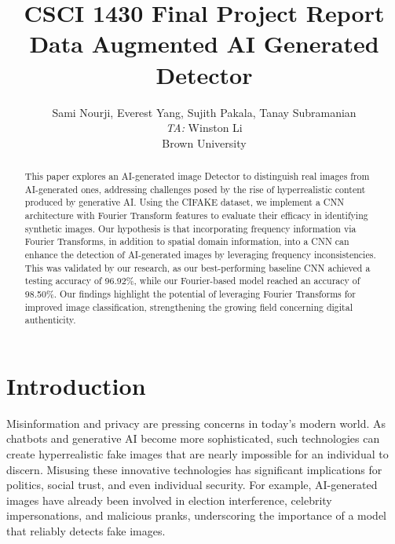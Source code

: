 \title{CSCI 1430 Final Project Report\\Data Augmented AI Generated Detector}

\author{Sami Nourji, Everest Yang, Sujith Pakala, Tanay Subramanian\\
    \emph{TA:} Winston Li \\
    Brown University\\
}

\maketitle

\begin{abstract}
    This paper explores an AI-generated image Detector to distinguish real images from AI-generated ones, addressing challenges posed by the rise of hyperrealistic content produced by generative AI. Using the CIFAKE dataset, we implement a CNN architecture with Fourier Transform features to evaluate their efficacy in identifying synthetic images. Our hypothesis is that incorporating frequency information via Fourier Transforms, in addition to spatial domain information, into a CNN can enhance the detection of AI-generated images by leveraging frequency inconsistencies. This was validated by our research, as our best-performing baseline CNN achieved a testing accuracy of 96.92\%, while our Fourier-based model reached an accuracy of 98.50\%. Our findings highlight the potential of leveraging Fourier Transforms for improved image classification, strengthening the growing field concerning digital authenticity.\end{abstract}

\section{Introduction}

Misinformation and privacy are pressing concerns in today’s modern world. As chatbots and generative AI become more sophisticated, such technologies can create hyperrealistic fake images that are nearly impossible for an individual to discern. Misusing these innovative technologies has significant implications for politics, social trust, and even individual security. For example, AI-generated images have already been involved in election interference, celebrity impersonations, and malicious pranks, underscoring the importance of a model that reliably detects fake images.

